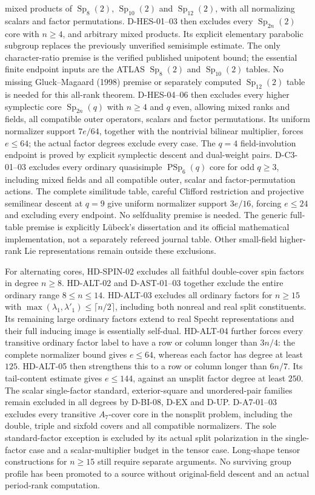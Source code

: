 \documentclass[11pt]{article}
\theoremstyle{remark}\newtheorem{remark}[theorem]{Remark}
\begin{document}
mixed products of $\operatorname{Sp}_8(2)$, $\operatorname{Sp}_{10}(2)$
and $\operatorname{Sp}_{12}(2)$, with all normalizing scalars and factor
permutations. D-HES-01--03 then excludes every
$\operatorname{Sp}_{2n}(2)$ core with $n\ge4$, and arbitrary mixed products.
Its explicit elementary parabolic subgroup replaces the previously
unverified semisimple estimate. The only character-ratio premise is the
verified published unipotent bound; the essential finite endpoint inputs
are the ATLAS $\operatorname{Sp}_8(2)$ and $\operatorname{Sp}_{10}(2)$
tables. No missing Gluck--Magaard (1998) premise or separately computed
$\operatorname{Sp}_{12}(2)$ table is needed for this all-rank theorem.
D-HES-04--06 then excludes every higher symplectic core
$\operatorname{Sp}_{2n}(q)$ with $n\ge4$ and $q$ even, allowing mixed
ranks and fields, all compatible outer operators, scalars and factor
permutations. Its uniform normalizer support $7e/64$, together with the
nontrivial bilinear multiplier, forces $e\le64$; the actual factor
degrees exclude every case. The $q=4$ field-involution endpoint is
proved by explicit symplectic descent and dual-weight pairs.
D-C3-01--03 excludes every ordinary quasisimple
$\operatorname{PSp}_6(q)$ core for odd $q\ge3$, including mixed
fields and all compatible outer, scalar and factor-permutation actions.
The complete similitude table, careful Clifford restriction and
projective semilinear descent at $q=9$ give uniform normalizer support
$3e/16$, forcing $e\le24$ and excluding every endpoint. No selfduality
premise is needed. The generic full-table premise is explicitly
L\"ubeck's dissertation and its official mathematical implementation,
not a separately refereed journal table. Other small-field higher-rank
Lie representations remain outside these exclusions.

For alternating cores, HD-SPIN-02 excludes all faithful double-cover
spin factors in degree $n\ge8$. HD-ALT-02 and D-AST-01--03 together
exclude the entire ordinary range $8\le n\le14$. HD-ALT-03 excludes
all ordinary factors for $n\ge15$ with
$\max(\lambda_1,\lambda'_1)\le\lceil n/2\rceil$, including both
nonreal and real split constituents. Its remaining large ordinary
factors extend to real Specht representations and their full inducing
image is essentially self-dual. HD-ALT-04 further forces every
transitive ordinary factor label to have a row or column longer than
$3n/4$: the complete normalizer bound gives $e\le64$, whereas
each factor has degree at least $125$. HD-ALT-05 then strengthens
this to a row or column longer than $6n/7$. Its tail-content
estimate gives $e\le144$, against an unsplit factor degree
at least $250$. The scalar single-factor
standard, exterior-square and unordered-pair families remain excluded
in all degrees by D-BI-08, D-EX and D-UP. D-A7-01--03 excludes
every transitive $A_7$-cover core in the nonsplit problem, including
the double, triple and sixfold covers and all compatible normalizers.
The sole standard-factor exception is excluded by its actual split
polarization in the single-factor case and a scalar-multiplier budget
in the tensor case. Long-shape tensor constructions for $n\ge15$
still require separate arguments. No surviving group profile has been promoted to a source
without original-field descent and an actual period-rank computation.
\end{document}
